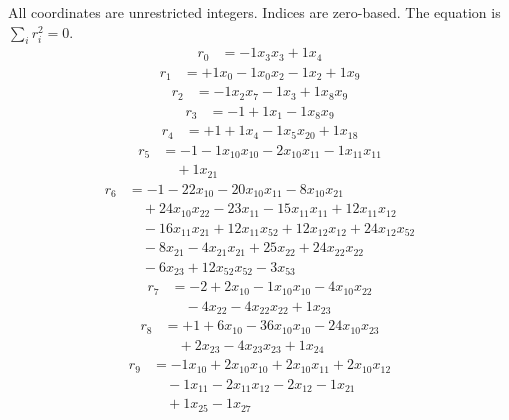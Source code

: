 \begingroup\small
All coordinates are unrestricted integers. Indices are zero-based. The equation is $\sum_i r_i^2=0$.
\[\begin{aligned}
r_{0} &= - 1 x_{3} x_{3} + 1 x_{4}
\end{aligned}\]
\[\begin{aligned}
r_{1} &= + 1 x_{0} - 1 x_{0} x_{2} - 1 x_{2} + 1 x_{9}
\end{aligned}\]
\[\begin{aligned}
r_{2} &= - 1 x_{2} x_{7} - 1 x_{3} + 1 x_{8} x_{9}
\end{aligned}\]
\[\begin{aligned}
r_{3} &= - 1 + 1 x_{1} - 1 x_{8} x_{9}
\end{aligned}\]
\[\begin{aligned}
r_{4} &= + 1 + 1 x_{4} - 1 x_{5} x_{20} + 1 x_{18}
\end{aligned}\]
\[\begin{aligned}
r_{5} &= - 1 - 1 x_{10} x_{10} - 2 x_{10} x_{11} - 1 x_{11} x_{11} \\
 &\quad + 1 x_{21}
\end{aligned}\]
\[\begin{aligned}
r_{6} &= - 1 - 22 x_{10} - 20 x_{10} x_{11} - 8 x_{10} x_{21} \\
 &\quad + 24 x_{10} x_{22} - 23 x_{11} - 15 x_{11} x_{11} + 12 x_{11} x_{12} \\
 &\quad - 16 x_{11} x_{21} + 12 x_{11} x_{52} + 12 x_{12} x_{12} + 24 x_{12} x_{52} \\
 &\quad - 8 x_{21} - 4 x_{21} x_{21} + 25 x_{22} + 24 x_{22} x_{22} \\
 &\quad - 6 x_{23} + 12 x_{52} x_{52} - 3 x_{53}
\end{aligned}\]
\[\begin{aligned}
r_{7} &= - 2 + 2 x_{10} - 1 x_{10} x_{10} - 4 x_{10} x_{22} \\
 &\quad - 4 x_{22} - 4 x_{22} x_{22} + 1 x_{23}
\end{aligned}\]
\[\begin{aligned}
r_{8} &= + 1 + 6 x_{10} - 36 x_{10} x_{10} - 24 x_{10} x_{23} \\
 &\quad + 2 x_{23} - 4 x_{23} x_{23} + 1 x_{24}
\end{aligned}\]
\[\begin{aligned}
r_{9} &= - 1 x_{10} + 2 x_{10} x_{10} + 2 x_{10} x_{11} + 2 x_{10} x_{12} \\
 &\quad - 1 x_{11} - 2 x_{11} x_{12} - 2 x_{12} - 1 x_{21} \\
 &\quad + 1 x_{25} - 1 x_{27}
\end{aligned}\]
